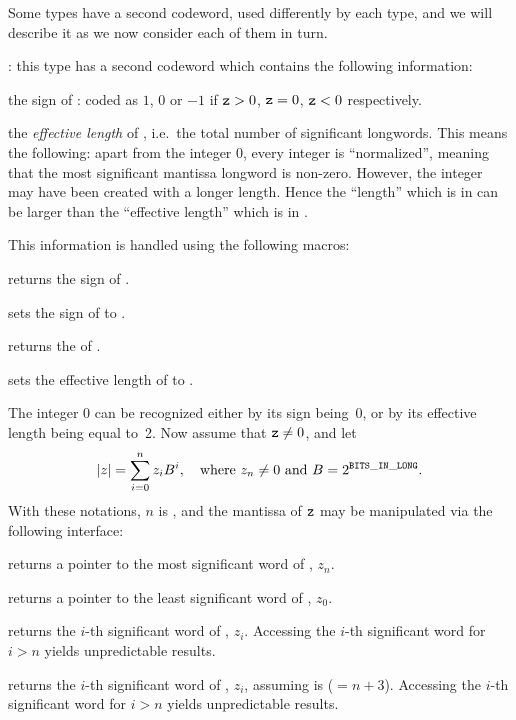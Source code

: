 Some types have a second codeword, used differently by each type, and
we will describe it as we now consider each of them in turn.

:
this type has a second codeword  which
contains the following information:

the sign of : coded as $1$, $0$ or $-1$ if ${\tt z} > 0$, ${\tt z} = 0$,
${\tt z} < 0$ respectively.

the \emph{effective length} of , i.e.~the total number of significant
longwords. This means the following: apart from the integer 0, every integer
is ``normalized'', meaning that the most significant mantissa longword is
non-zero. However, the integer may have been created with a longer length.
Hence the ``length'' which is in  can be larger than the
``effective length'' which is in .

\noindent This information is handled using the following macros:

 returns the sign of .

 sets the sign of  to .

 returns the  of .

 sets the effective length
of  to .

The integer 0 can be recognized either by its sign being~0, or by its
effective length being equal to~2. Now assume that ${\tt z} \ne 0$, and let
$$ |z| = \sum_{i = 0}^n z_i B^i,
  \quad{\rm where}~z_n\ne 0~{\rm and}~B = 2^{{\tt BITS\_IN\_LONG}}.
$$
With these notations, $n$ is , and the mantissa of
${\tt z}$ may be manipulated via the following interface:

 returns a pointer to the most significant word of
, $z_n$.

 returns a pointer to the least significant word of
, $z_0$.

 returns the $i$-th significant word of
, $z_i$. Accessing the $i$-th significant word for $i > n$
yields unpredictable results.

 returns the $i$-th significant
word of , $z_i$, assuming  is  ($= n + 3$).
Accessing the $i$-th significant word for $i > n$ yields unpredictable
results.

